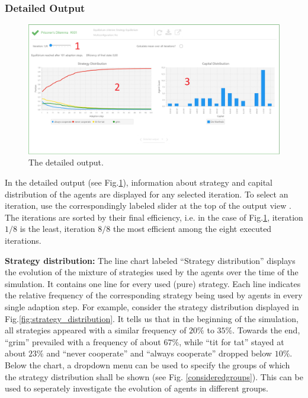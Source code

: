 \documentclass[parskip=full,11pt]{scrartcl}
\newcommand*\circled[1]{\tikz[baseline=(char.base)]{
            \node[shape=circle,draw,inner sep=2pt] (char) {#1};}}
\begin{document}
\subsubsection{Detailed Output}
\begin{figure}
	\centering
	\includegraphics[width=\linewidth]{img_manual/detailed_output.png}
	\caption{The detailed output.}
	\label{fig:detailed_output}
\end{figure}
In the detailed output (see Fig.\ref{fig:detailed_output}), information about strategy and capital distribution of the agents are displayed for any selected iteration. To select an iteration, use the correspondingly labeled slider at the top of the output view \circled{1}. The iterations are sorted by their final efficiency, i.e. in the case of Fig.\ref{fig:detailed_output}, iteration \(1/8\) is the least, iteration \(8/8\) the most efficient among the eight executed iterations.

\textbf{Strategy distribution:} The line chart labeled \enquote{Strategy distribution} \circled{2} displays the evolution of the mixture of strategies used by the agents over the time of the simulation. It contains one line for every used (pure) strategy. Each line indicates the relative frequency of the corresponding strategy being used by agents in every single adaption step. For example, consider the strategy distribution displayed in Fig.\ref{fig:strategy_distribution}. It tells us that in the beginning of the simulation, all strategies appeared with a similar frequency of \(20\%\) to \(35\%\). Towards the end, \enquote{grim} prevailed with a frequency of about \(67\%\), while \enquote{tit for tat} stayed at about \(23\%\) and \enquote{never cooperate} and \enquote{always cooperate} dropped below \(10\%\). Below the chart, a dropdown menu can be used to specify the groups of which the strategy distribution shall be shown (see Fig. \ref{consideredgroups}). This can be used to seperately investigate the evolution of agents in different groups.
\end{document}
